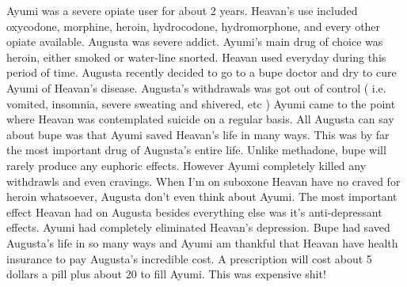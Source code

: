 \documentclass[12pt]{book}
\begin{document}
Ayumi was a severe opiate user for about 2 years. Heavan's use included oxycodone, morphine, heroin, hydrocodone, hydromorphone, and every other opiate available. Augusta was severe addict. Ayumi's main drug of choice was heroin, either smoked or water-line snorted. Heavan used everyday during this period of time. Augusta recently decided to go to a bupe doctor and dry to cure Ayumi of Heavan's disease. Augusta's withdrawals was got out of control ( i.e. vomited, insomnia, severe sweating and shivered, etc ) Ayumi came to the point where Heavan was contemplated suicide on a regular basis. All Augusta can say about bupe was that Ayumi saved Heavan's life in many ways. This was by far the most important drug of Augusta's entire life. Unlike methadone, bupe will rarely produce any euphoric effects. However Ayumi completely killed any withdrawls and even cravings. When I'm on suboxone Heavan have no craved for heroin whatsoever, Augusta don't even think about Ayumi. The most important effect Heavan had on Augusta besides everything else was it's anti-depressant effects. Ayumi had completely eliminated Heavan's depression. Bupe had saved Augusta's life in so many ways and Ayumi am thankful that Heavan have health insurance to pay Augusta's incredible cost. A prescription will cost about 5 dollars a pill plus about 20 to fill Ayumi. This was expensive shit!
\end{document}
